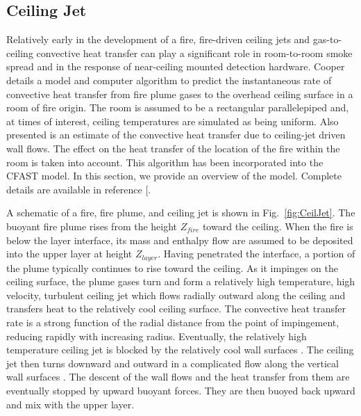\subsection{Ceiling Jet}

Relatively early in the development of a fire, fire-driven ceiling jets and gas-to-ceiling convective heat transfer can play a significant role in room-to-room smoke spread and in the response of near-ceiling mounted detection hardware.  Cooper \cite{Cooper:1991} details a model and computer algorithm to predict the instantaneous rate of convective heat transfer from fire plume gases to the overhead ceiling surface in a room of fire origin.  The room is assumed to be a rectangular parallelepiped and, at times of interest, ceiling temperatures are simulated as being uniform.  Also presented is an estimate of the convective heat transfer due to ceiling-jet driven wall flows.  The effect on the heat transfer of the location of the fire within the room is taken into account.  This algorithm has been incorporated into the CFAST model.  In this section, we provide an overview of the model.  Complete details are available in reference [\cite{Cooper:1991}.

A schematic of a fire, fire plume, and ceiling jet is shown in Fig.~\ref{fig:CeilJet}. The buoyant fire plume rises from the height $Z_{fire}$ toward the ceiling.  When the fire is below the layer interface, its mass and enthalpy flow are assumed to be deposited into the upper layer at height $Z_{layer}$.  Having penetrated the interface, a portion of the plume typically continues to rise toward the ceiling.  As it impinges on the ceiling surface, the plume gases turn and form a relatively high temperature, high velocity, turbulent ceiling jet which flows radially outward along the ceiling and transfers heat to the relatively cool ceiling surface.  The convective heat transfer rate is a strong function of the radial distance from the point of impingement, reducing rapidly with increasing radius.  Eventually, the relatively high temperature ceiling jet is blocked by the relatively cool wall surfaces \cite{Cooper:1990a}.  The ceiling jet then turns downward and outward in a complicated flow along the vertical wall surfaces \cite{Cooper:1988, Jaluria:1989} .  The descent of the wall flows and the heat transfer from them are eventually stopped by upward buoyant forces.  They are then buoyed back upward and mix with the upper layer.

